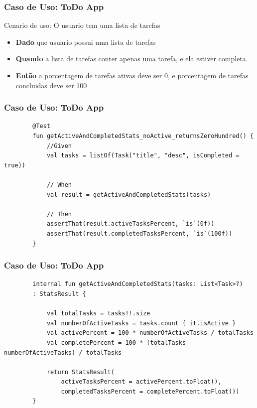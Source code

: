 \documentclass{beamer}
\begin{document}
\begin{frame}
\frametitle{Caso de Uso: ToDo App}
Cenario de uso: O usuario tem uma lista de tarefas
\begin{itemize}
\item \textbf{Dado} que usuario possui uma lista de tarefas
\item \textbf{Quando} a lista de tarefas conter apenas uma tarefa, e ela estiver completa.
\item \textbf{Então} a porcentagem de tarefas ativas deve ser 0, e porcentagem de tarefas concluidas deve ser 100
\end{itemize}
\end{frame}

\begin{frame}[fragile]
	\frametitle{Caso de Uso: ToDo App}
	\begin{example}
		\begin{lstlisting}
		@Test
		fun getActiveAndCompletedStats_noActive_returnsZeroHundred() {
			//Given
			val tasks = listOf(Task("title", "desc", isCompleted = true))
			
			// When 
			val result = getActiveAndCompletedStats(tasks)
		
			// Then 
			assertThat(result.activeTasksPercent, `is`(0f))
			assertThat(result.completedTasksPercent, `is`(100f))
		}
		\end{lstlisting}
	\end{example}
\end{frame}

\begin{frame}[fragile]
	\frametitle{Caso de Uso: ToDo App}
	\begin{example}
		\begin{lstlisting}
		internal fun getActiveAndCompletedStats(tasks: List<Task>?)
		: StatsResult {
		
			val totalTasks = tasks!!.size
			val numberOfActiveTasks = tasks.count { it.isActive }
			val activePercent = 100 * numberOfActiveTasks / totalTasks
			val completePercent = 100 * (totalTasks - numberOfActiveTasks) / totalTasks
		
			return StatsResult(
				activeTasksPercent = activePercent.toFloat(),
				completedTasksPercent = completePercent.toFloat())
		}
		\end{lstlisting}
	\end{example}
\end{frame}
\end{document}
